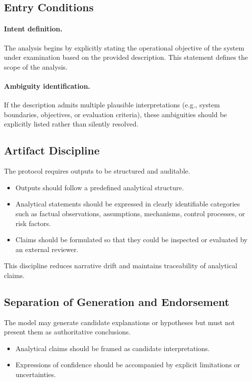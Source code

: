 \subsection{Entry Conditions}

\paragraph{Intent definition.}
The analysis begins by explicitly stating the operational objective of the
system under examination based on the provided description. This statement
defines the scope of the analysis.

\paragraph{Ambiguity identification.}
If the description admits multiple plausible interpretations (e.g.,
system boundaries, objectives, or evaluation criteria), these ambiguities
should be explicitly listed rather than silently resolved.

\subsection{Artifact Discipline}

The protocol requires outputs to be structured and auditable.

\begin{itemize}
\item Outputs should follow a predefined analytical structure.
\item Analytical statements should be expressed in clearly identifiable
categories such as factual observations, assumptions, mechanisms,
control processes, or risk factors.
\item Claims should be formulated so that they could be inspected or
evaluated by an external reviewer.
\end{itemize}

This discipline reduces narrative drift and maintains traceability of
analytical claims.

\subsection{Separation of Generation and Endorsement}

The model may generate candidate explanations or hypotheses but must not
present them as authoritative conclusions.

\begin{itemize}
\item Analytical claims should be framed as candidate interpretations.
\item Expressions of confidence should be accompanied by explicit
limitations or uncertainties.
\end{itemize}

